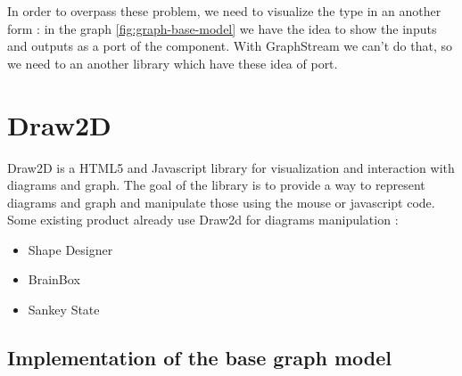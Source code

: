 \begin{figure}[h]
    \centering
    \caption[Label on multiple edges using GraphStream]{}
    \label{fig:graphstream-lot-of-edges}
\end{figure}

In order to overpass these problem, we need to visualize the type in an another form : in the graph \ref{fig:graph-base-model} we have the idea to show the inputs and outputs as a port of the component. With GraphStream we can't do that, so we need to an another library which have these idea of port.



\section{Draw2D} %
\label{sec:Draw2D}

Draw2D is a HTML5 and Javascript library for visualization and interaction with diagrams and graph\cite{draw2d}. The goal of the library is to provide a way to represent diagrams and graph and manipulate those using the mouse or javascript code. Some existing product already use Draw2d for diagrams manipulation :

\begin{itemize}
    \item Shape Designer\cite{draw2d}
    \item BrainBox\cite{draw2d}
    \item Sankey State\cite{draw2d}
\end{itemize}

\subsection{Implementation of the base graph model} %
\label{sub:Implementation of the base graph model}


